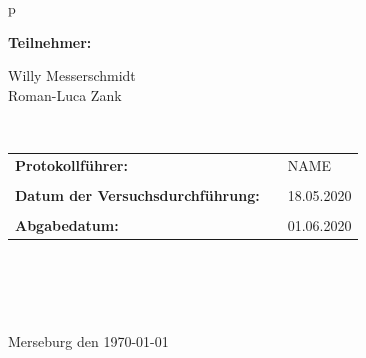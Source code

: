 \begin{center}
\begin{tabular}{p{\textwidth}}

\begin{center}
\Large{\textbf{Teilnehmer:}} \\ 
\end{center}
\begin{center}
\large{Willy Messerschmidt \\
	Roman-Luca Zank} \\
\end{center}


\\

\begin{center}
\begin{tabular}{lll}
\large{\textbf{Protokollführer:}} & & \large{NAME}\\
&&\\
\large{\textbf{Datum der Versuchsdurchführung:}}&& \large{18.05.2020}\\
&&\\
\large{\textbf{Abgabedatum:}}&& \large{01.06.2020}
\end{tabular}
\end{center}

\\ \\ \\ \\
\large{Merseburg den \today}

\end{tabular}
\end{center}
